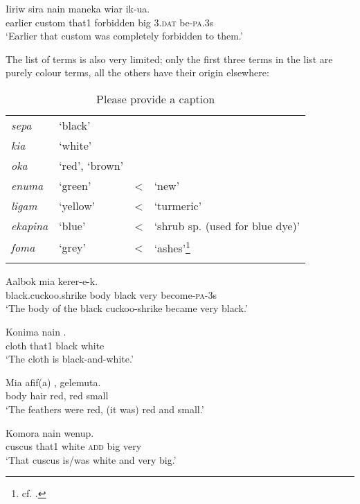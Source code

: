 \ea%
\label{ex:3:x1759}
\gll Iiriw sira nain  maneka wiar ik-ua. \\
earlier custom that1 forbidden big 3.\textsc{dat} be-\textsc{pa}.3s\\
\glt`Earlier that custom was completely forbidden to them.'
\z

The list of  terms is also very limited; only the first three terms in the list are purely colour terms, all the others have their origin elsewhere:

\begin{table}
\caption{Please provide a caption}
\label{} 
\begin{tabular}{>{\itshape}llcl}
\mytoprule
sepa &`black'&&\\
kia &`white'&&\\
oka &`red', `brown'&&\\
enuma &`green' &{\textless} &`new'\\
ligam &`yellow' &{\textless} &`turmeric'\\
ekapina &`blue' &{\textless} &`shrub sp. (used for blue dye)'\\
foma &`grey' &{\textless} &`ashes'\footnote{cf. \cite[4]{BerlinEtAl1969}.}\\
\mybottomrule
\end{tabular}

\end{table}

\ea%
\label{ex:3:x1753}
\gll Aalbok mia    kerer-e-k. \\
black.cuckoo.shrike body black very become-\textsc{pa}-3s\\
\glt`The body of the black cuckoo-shrike became very black.'
\z

\ea%
\label{ex:3:x109}
\gll Konima nain  . \\
cloth that1 black white\\
\glt`The cloth is black-and-white.'
\z

\ea%
\label{ex:3:x1754}
\gll Mia afif(a) ,  gelemuta. \\
body hair red, red small\\
\glt`The feathers were red, (it was) red and small.'
\z

\ea%
\label{ex:3:x1755}
\gll Komora nain    wenup. \\
cuscus that1 white \textsc{add} big very\\
\glt`That cuscus is/was white and very big.'
\z

